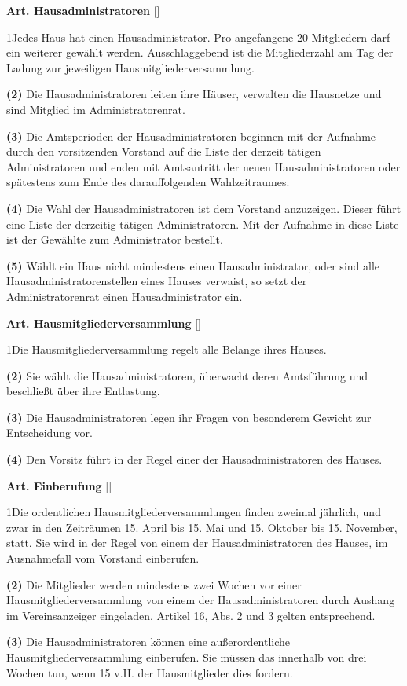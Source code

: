 \documentclass[12pt]{article}
\newcommand{\Satz}[2]{

\begin{samepage}
{\bf (#1)} #2
\end{samepage}
}
\newenvironment{Artikel}[2]{
\bigskip \centerline{{\bf Art. #1} [#2]}
\nopagebreak
}{
}
\begin{document}
\begin{Artikel}{19}{Hausadministratoren}

\Satz{1}{Jedes Haus hat einen Hausadministrator.
  Pro angefangene 20 Mitgliedern darf ein weiterer gewählt werden.
  Ausschlaggebend ist die Mitgliederzahl am Tag der Ladung zur jeweiligen Hausmitgliederversammlung.}

\Satz{2}{Die Hausadministratoren leiten ihre Häuser, verwalten die Hausnetze und sind Mitglied im Administratorenrat.}

\Satz{3}{Die Amtsperioden der Hausadministratoren beginnen mit der Aufnahme durch den vorsitzenden Vorstand auf die Liste der derzeit tätigen Administratoren und enden mit Amtsantritt der neuen Hausadministratoren oder spätestens zum Ende des darauffolgenden Wahlzeitraumes.}

\Satz{4}{Die Wahl der Hausadministratoren ist dem Vorstand anzuzeigen.
  Dieser führt eine Liste der derzeitig tätigen Administratoren.
  Mit der Aufnahme in diese Liste ist der Gewählte zum Administrator bestellt.}

\Satz{5}{Wählt ein Haus nicht mindestens einen Hausadministrator, oder sind alle Hausadministratorenstellen eines Hauses verwaist, so setzt der Administratorenrat einen Hausadministrator ein.}

\end{Artikel}

\begin{Artikel}{20}{Hausmitgliederversammlung}

\Satz{1}{Die Hausmitgliederversammlung regelt alle Belange ihres Hauses.}

\Satz{2}{Sie wählt die Hausadministratoren, überwacht deren Amtsführung und beschließt über ihre Entlastung.}

\Satz{3}{Die Hausadministratoren legen ihr Fragen von besonderem Gewicht zur Entscheidung vor.}

\Satz{4}{Den Vorsitz führt in der Regel einer der Hausadministratoren des Hauses.}

\end{Artikel}

\begin{Artikel}{21}{Einberufung}

\Satz{1}{Die ordentlichen Hausmitgliederversammlungen finden zweimal jährlich, und zwar in den Zeiträumen 15. April bis 15. Mai und 15. Oktober bis 15. November, statt.
  Sie wird in der Regel von einem der Hausadministratoren des Hauses, im Ausnahmefall vom Vorstand einberufen.}

\Satz{2}{Die Mitglieder werden mindestens zwei Wochen vor einer Hausmitgliederversammlung von einem der Hausadministratoren durch Aushang im Vereinsanzeiger eingeladen.
  Artikel 16, Abs. 2 und 3 gelten entsprechend.}

\Satz{3}{Die Hausadministratoren können eine außerordentliche Hausmitgliederversammlung einberufen.
  Sie müssen das innerhalb von drei Wochen tun, wenn 15 v.H. der Hausmitglieder dies fordern.}

\end{Artikel}
\end{document}
